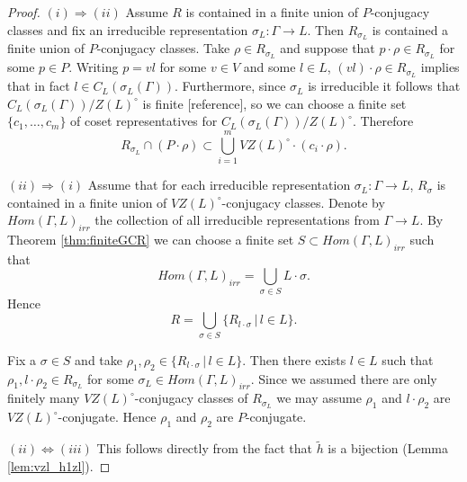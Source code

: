 \begin{proof}\quad

  $(i) \Rightarrow (ii)$ Assume $R$ is contained in a finite union of $P$-conjugacy classes and fix an irreducible representation $\sigma_L : \Gamma \rightarrow L$. Then $R_{\sigma_L}$ is contained a finite union of $P$-conjugacy classes. Take $\rho \in R_{\sigma_L}$ and suppose that $p \cdot \rho \in R_{\sigma_L}$ for some $p \in P$. Writing $p = vl$ for some $v \in V$ and some $l \in L$, $(vl) \cdot \rho \in R_{\sigma_L}$ implies that in fact $l \in C_L(\sigma_L(\Gamma))$. Furthermore, since $\sigma_L$ is irreducible it follows that $C_L(\sigma_L(\Gamma))/Z(L)^\circ$ is finite [reference], so we can choose a finite set $\{c_1, \ldots, c_m\}$ of coset representatives for $C_L(\sigma_L(\Gamma))/Z(L)^\circ$. Therefore
  \begin{displaymath}
    R_{\sigma_L} \cap (P \cdot \rho) \subset \bigcup_{i = 1}^{m} VZ(L)^\circ \cdot \left( c_i \cdot \rho \right).
  \end{displaymath}

  $(ii) \Rightarrow (i)$ Assume that for each irreducible representation $\sigma_L : \Gamma \rightarrow L$, $R_{\sigma}$ is contained in a finite union of $VZ(L)^\circ$-conjugacy classes. Denote by $Hom(\Gamma, L)_{irr}$ the collection of all irreducible representations from $\Gamma \rightarrow L$. By Theorem \ref{thm:finiteGCR} we can choose a finite set $S \subset Hom(\Gamma, L)_{irr}$ such that
  \begin{displaymath}
    Hom(\Gamma, L)_{irr} = \bigcup_{\sigma \in S} L \cdot \sigma.
  \end{displaymath}
  Hence 
  \begin{displaymath}
    R = \bigcup_{\sigma \in S} \{R_{l \cdot \sigma} \,|\, l \in L \}.
  \end{displaymath}

  Fix a $\sigma \in S$ and take $\rho_1, \rho_2 \in \{R_{l \cdot \sigma} \,|\, l \in L\}$. Then there exists $l \in L$ such that $\rho_1, l \cdot \rho_2 \in R_{\sigma_L}$ for some $\sigma_L \in Hom(\Gamma, L)_{irr}$. Since we assumed there are only finitely many $VZ(L)^\circ$-conjugacy classes of $R_{\sigma_L}$ we may assume $\rho_1$ and $l \cdot \rho_2$ are $VZ(L)^\circ$-conjugate. Hence $\rho_1$ and $\rho_2$ are $P$-conjugate.

  $(ii) \Leftrightarrow (iii)$ This follows directly from the fact that $\tilde{h}$ is a bijection (Lemma \ref{lem:vzl_h1zl}).

\end{proof}

